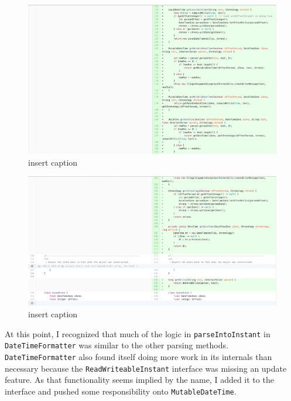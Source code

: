 \begin{figure}[H]
	\centering
	\includegraphics[width=\linewidth]{code51}
	\caption{insert caption}
\end{figure}
\begin{figure}[H]
	\centering
	\includegraphics[width=\linewidth]{code52}
	\caption{insert caption}
\end{figure}

At this point, I recognized that much of the logic in \texttt{parseIntoInstant} in \texttt{DateTimeFormatter} was similar to the other parsing methods. \texttt{DateTimeFormatter} also found itself doing more work in its internals than necessary because the \texttt{ReadWriteableInstant} interface was missing an update feature. As that functionality seems implied by the name, I added it to the interface and pushed some responsibility onto \texttt{MutableDateTime}.

